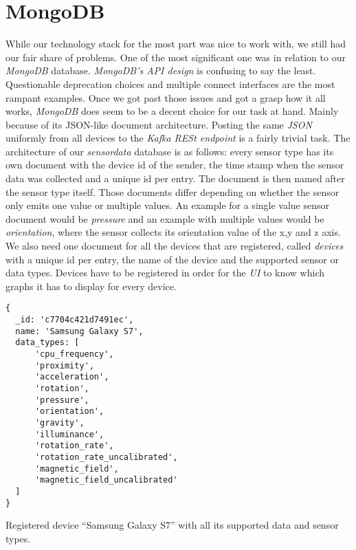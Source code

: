 \section{MongoDB}

While our technology stack for the most part was nice to work with, we still had our fair share of
problems. One of the most significant one was in relation to our \textit{MongoDB} database.
\textit{MongoDB’s API design} is confusing to say the least. Questionable deprecation choices and
multiple connect interfaces are the most rampant examples. Once we got past those issues and got a
grasp how it all works, \textit{MongoDB} does seem to be a decent choice for our task at hand.
Mainly because of its JSON-like document architecture. Posting the same \textit{JSON} uniformly from
all devices to the \textit{Kafka RESt endpoint} is a fairly trivial task. The architecture of our
\textit{sensordata} database is as follows: every sensor type has its own document with the device
id of the sender, the time stamp when the sensor data was collected and a unique id per entry. The
document is then named after the sensor type itself. Those documents differ depending on whether the
sensor only emits one value or multiple values. An example for a single value sensor document would
be \textit{pressure} and an example with multiple values would be \textit{orientation}, where the
sensor collects its orientation value of the x,y and z axis. We also need one document for all the
devices that are registered, called \textit{devices} with a unique id per entry, the name of the
device and the supported sensor or data types. Devices have to be registered in order for the
\textit{UI} to know which graphs it has to display for every device.

\begin{code}[H]
  \centering
  \begin{lstlisting}[basicstyle=\small\ttfamily]
{
  _id: 'c7704c421d7491ec',
  name: 'Samsung Galaxy S7',
  data_types: [
      'cpu_frequency',
      'proximity',
      'acceleration',
      'rotation',
      'pressure',
      'orientation',
      'gravity',
      'illuminance',
      'rotation_rate',
      'rotation_rate_uncalibrated',
      'magnetic_field',
      'magnetic_field_uncalibrated'
  ]
}
  \end{lstlisting}
  \caption{Registered device “Samsung Galaxy S7” with all its supported data and sensor types.}
\end{code}
